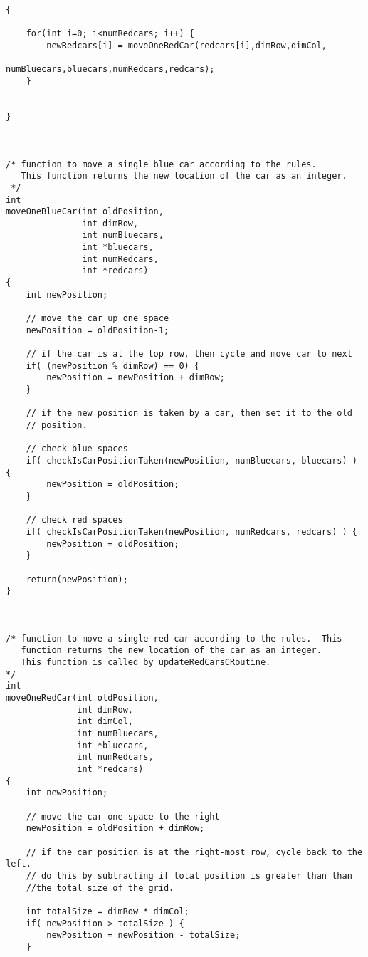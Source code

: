 \documentclass[11pt]{article}
\begin{document}
\begin{verbatim}
{

    for(int i=0; i<numRedcars; i++) {
        newRedcars[i] = moveOneRedCar(redcars[i],dimRow,dimCol,
                                        numBluecars,bluecars,numRedcars,redcars);
    }


}



/* function to move a single blue car according to the rules.
   This function returns the new location of the car as an integer.
 */
int
moveOneBlueCar(int oldPosition,
               int dimRow,
               int numBluecars,
               int *bluecars,
               int numRedcars,
               int *redcars) 
{
    int newPosition;

    // move the car up one space
    newPosition = oldPosition-1;

    // if the car is at the top row, then cycle and move car to next
    if( (newPosition % dimRow) == 0) {
        newPosition = newPosition + dimRow;
    }

    // if the new position is taken by a car, then set it to the old
    // position.

    // check blue spaces
    if( checkIsCarPositionTaken(newPosition, numBluecars, bluecars) ) {
        newPosition = oldPosition;
    }

    // check red spaces
    if( checkIsCarPositionTaken(newPosition, numRedcars, redcars) ) {
        newPosition = oldPosition;
    }

    return(newPosition);
}



/* function to move a single red car according to the rules.  This
   function returns the new location of the car as an integer. 
   This function is called by updateRedCarsCRoutine.
*/
int
moveOneRedCar(int oldPosition,
              int dimRow,
              int dimCol,
              int numBluecars,
              int *bluecars,
              int numRedcars,
              int *redcars) 
{
    int newPosition;

    // move the car one space to the right
    newPosition = oldPosition + dimRow;

    // if the car position is at the right-most row, cycle back to the left.
    // do this by subtracting if total position is greater than than
    //the total size of the grid.

    int totalSize = dimRow * dimCol;
    if( newPosition > totalSize ) {
        newPosition = newPosition - totalSize;
    }


\end{verbatim}
\end{document}
